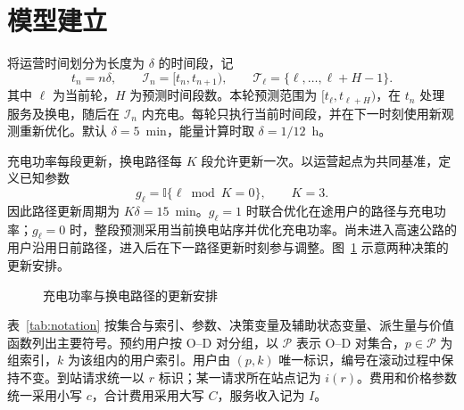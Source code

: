 \documentclass[12pt,a4paper,UTF8]{ctexart}
\numberwithin{equation}{section}
\newcommand{\ind}{\mathbb I}
\begin{document}
\section{模型建立}

将运营时间划分为长度为 $\delta$ 的时间段，记
\begin{equation}
t_n=n\delta,\qquad \mathcal I_n=[t_n,t_{n+1}),\qquad
\mathcal T_\ell=\{\ell,\ldots,\ell+H-1\}.
\label{eq:time_grid}
\end{equation}
其中 $\ell$ 为当前轮，$H$ 为预测时间段数。本轮预测范围为 $[t_\ell,t_{\ell+H})$，在 $t_n$ 处理服务及换电，随后在 $\mathcal I_n$ 内充电。每轮只执行当前时间段，并在下一时刻使用新观测重新优化。默认 $\delta=5$~min，能量计算时取 $\delta=1/12$~h。

充电功率每段更新，换电路径每 $K$ 段允许更新一次。以运营起点为共同基准，定义已知参数
\begin{equation}
g_\ell=\ind\{\ell\bmod K=0\},\qquad K=3.
\label{eq:update_clock}
\end{equation}
因此路径更新周期为 $K\delta=15$~min。$g_\ell=1$ 时联合优化在途用户的路径与充电功率；$g_\ell=0$ 时，整段预测采用当前换电站序并优化充电功率。尚未进入高速公路的用户沿用日前路径，进入后在下一路径更新时刻参与调整。图~\ref{fig:updates} 示意两种决策的更新安排。

\begin{figure}[!htbp]
\centering
{}
\caption{充电功率与换电路径的更新安排}
\label{fig:updates}
\end{figure}

表~\ref{tab:notation} 按集合与索引、参数、决策变量及辅助状态变量、派生量与价值函数列出主要符号。预约用户按 O--D 对分组，以 $\mathcal P$ 表示 O--D 对集合，$p\in\mathcal P$ 为组索引，$k$ 为该组内的用户索引。用户由 $(p,k)$ 唯一标识，编号在滚动过程中保持不变。到站请求统一以 $r$ 标识；某一请求所在站点记为 $i(r)$。费用和价格参数统一采用小写 $c$，合计费用采用大写 $C$，服务收入记为 $I$。
\end{document}
